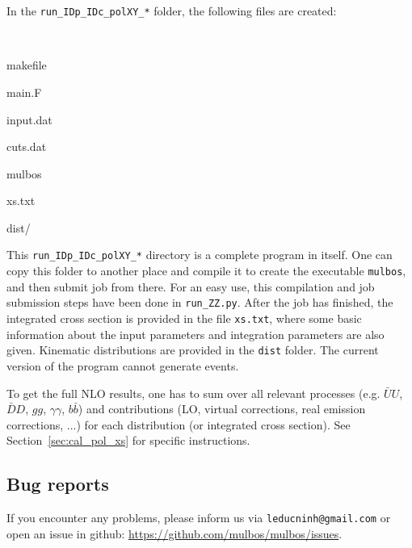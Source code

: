 \documentclass[english,12pt]{article}
\newcommand{\sect}[1]{Section~\ref{#1}}
\begin{document}
In the {\tt run\_IDp\_IDc\_polXY\_*} folder, the following files are created:
\begin{enumerate}
{\tt
\item makefile
\item main.F
\item input.dat
\item cuts.dat
\item mulbos
\item xs.txt
\item dist/
}
\end{enumerate}
This {\tt run\_IDp\_IDc\_polXY\_*} directory is a complete program in itself. 
One can copy this folder to another place and compile it to create the executable {\tt mulbos}, 
and then submit job from there. 
For an easy use, this compilation and job submission steps have been done in {\tt run\_ZZ.py}. 
After the job has finished, the integrated cross section is provided in the file {\tt xs.txt}, where
some basic information about the input parameters and integration parameters are also given. 
Kinematic distributions are provided in the {\tt dist} folder. 
The current version of the program cannot generate events.

To get the full NLO results, one has to sum over all relevant processes (e.g. $\bar{U}U$, $\bar{D}D$, $gg$, $\gamma\gamma$, $b\bar{b}$) 
and contributions (LO, virtual corrections, real emission corrections, ...) 
for each distribution (or integrated cross section). See \sect{sec:cal_pol_xs} for specific instructions. 
\subsection{Bug reports}
If you encounter any problems, please inform us via {\tt leducninh@gmail.com} 
or open an issue in github: \url{https://github.com/mulbos/mulbos/issues}.
\end{document}
